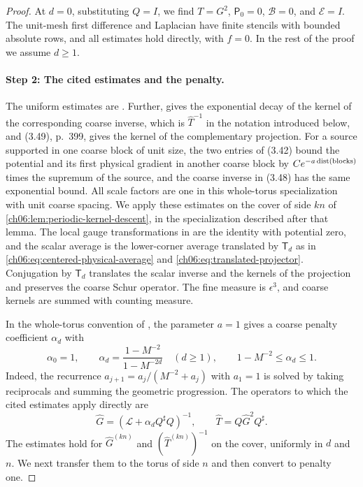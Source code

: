 \begin{proof}
At $d=0$, substituting $Q=I$, we find $T=G^2$, $\mathsf P_0=0$, $\mathscr B=0$, and $\mathscr E=I$. The unit-mesh first difference and Laplacian have finite stencils with bounded absolute rows, and all estimates hold directly, with $f=0$. In the rest of the proof we assume $d\ge1$.

\paragraph{Step 2: The cited estimates and the penalty.}
The uniform estimates are \cite[Theorem~3.1, the potential and first-gradient entries of (3.42), p.~397, and the global bounds (3.47), p.~398]{Balaban1985Background}. Further, \cite[Theorem~3.2, (3.48), p.~398]{Balaban1985Background} gives the exponential decay of the kernel of the corresponding coarse inverse, which is $\widehat T^{-1}$ in the notation introduced below, and (3.49), p.~399, gives the kernel of the complementary projection. For a source supported in one coarse block of unit size, the two entries of (3.42) bound the potential and its first physical gradient in another coarse block by $Ce^{-a\operatorname{dist}(\text{blocks})}$ times the supremum of the source, and the coarse inverse in (3.48) has the same exponential bound. All scale factors are one in this whole-torus specialization with unit coarse spacing. We apply these estimates on the cover of side $kn$ of \cref{ch06:lem:periodic-kernel-descent}, in the specialization described after that lemma. The local gauge transformations in \cite[(3.35)--(3.36), p.~396]{Balaban1985Background} are the identity with potential zero, and the scalar average is the lower-corner average translated by $\mathsf T_d$ as in \eqref{ch06:eq:centered-physical-average} and \eqref{ch06:eq:translated-projector}. Conjugation by $\mathsf T_d$ translates the scalar inverse and the kernels of the projection and preserves the coarse Schur operator. The fine measure is $\epsilon^3$, and coarse kernels are summed with counting measure.

In the whole-torus convention of \cite[(3.24), p.~394]{Balaban1985Background}, the parameter $a=1$ gives a coarse penalty coefficient $\alpha_d$ with
\[
 \alpha_0=1,\qquad\alpha_d=\frac{1-M^{-2}}{1-M^{-2d}}\quad(d\ge1),\qquad1-M^{-2}\le\alpha_d\le1.
\]
Indeed, the recurrence $a_{j+1}=a_j/(M^{-2}+a_j)$ with $a_1=1$ is solved by taking reciprocals and summing the geometric progression. The operators to which the cited estimates apply directly are
\[
 \widehat G=(\mathscr L+\alpha_dQ^\sharp Q)^{-1},\qquad\widehat T=Q\widehat G^2Q^\sharp.
\]
The estimates hold for $\widehat G^{(kn)}$ and $(\widehat T^{(kn)})^{-1}$ on the cover, uniformly in $d$ and $n$. We next transfer them to the torus of side $n$ and then convert to penalty one.


\end{proof}
